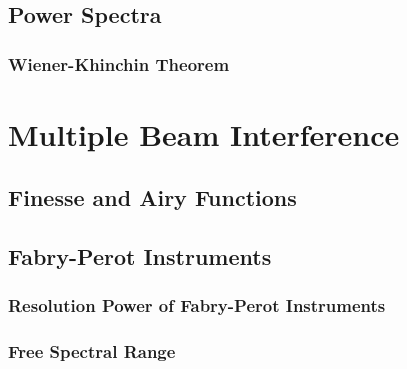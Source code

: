 \documentclass[../electromagnetism.tex]{subfiles}
\begin{document}
\subsection{Power Spectra}
\subsubsection{Wiener-Khinchin Theorem}
\section{Multiple Beam Interference}
\subsection{Finesse and Airy Functions}
\subsection{Fabry-Perot Instruments}
\subsubsection{Resolution Power of Fabry-Perot Instruments}
\subsubsection{Free Spectral Range}
\end{document}
